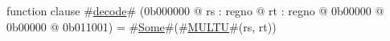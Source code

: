function clause #\hyperref[zdecode]{decode}# (0b000000 @ rs : regno @ rt : regno @ 0b00000 @ 0b00000 @ 0b011001) =
  #\hyperref[zSome]{Some}#(#\hyperref[zMULTU]{MULTU}#(rs, rt))
